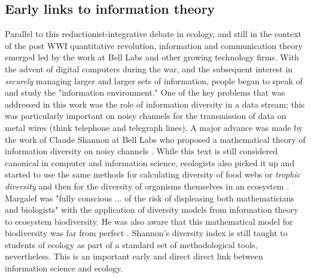 \subsection{Early links to information theory}
Parallel to this reductionist-integrative debate in ecology, and still in the context of the post WWI quantitative revolution, information and communication theory emerged led by the work at Bell Labs and other growing technology firms. With the advent of digital computers during the war, and the subsequent interest in \textit{securely} managing larger and larger sets of information, people began to speak of and study the "information environment." One of the key problems that was addressed in this work was the role of information diversity in a data stream; this was particularly important on noisy channels for the transmission of data on metal wires (think telephone and telegraph lines). A major advance was made by the work of Claude Shannon at Bell Labs who proposed a mathematical theory of information diversity on noisy channels \cite{shannon_1948}. While this text is still considered canonical in computer and information science, ecologists also picked it up and started to use the same methods for calculating diversity of food webs or \textit{trophic diversity} \cite{macarthur_1955} and then for the diversity of organisms themselves in an ecosystem \cite{margalef_1957}. Margalef was "fully conscious ... of the risk of displeasing both mathematicians and biologists" with the application of diversity models from information theory to ecosystem biodiversity. He was also aware that this mathematical model for biodiversity was far from perfect \cite{margalef_1957}. Shannon's diversity index is still taught to students of ecology as part of a standard set of methodological tools, nevertheless. This is an important early and direct direct link between information science and ecology.

